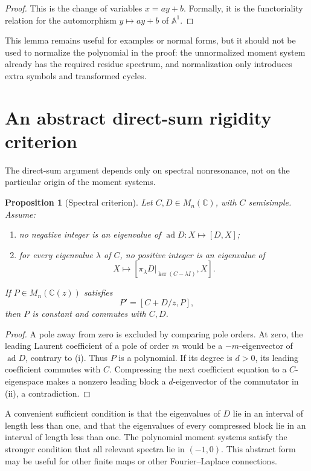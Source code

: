 \documentclass[11pt]{article}
\newtheorem{proposition}{Proposition}[section]
\theoremstyle{definition}
\newcommand{\C}{\mathbb C}
\newcommand{\Aone}{\mathbb A^1}
\begin{document}
\begin{proof}
This is the change of variables $x=ay+b$.  Formally, it is the
functoriality relation for the automorphism $y\mapsto ay+b$ of $\Aone$.
\end{proof}

This lemma remains useful for examples or normal forms, but it should not be
used to normalize the polynomial in the proof: the unnormalized moment
system already has the required residue spectrum, and normalization only
introduces extra symbols and transformed cycles.

\section{An abstract direct-sum rigidity criterion}

The direct-sum argument depends only on spectral nonresonance, not on the
particular origin of the moment systems.

\begin{proposition}[Spectral criterion]
Let $C,D\in M_n(\C)$, with $C$ semisimple.  Assume:
\begin{enumerate}[label=\textup{(\roman*)},leftmargin=2.4em]
\item no negative integer is an eigenvalue of
$\operatorname{ad}D:X\mapsto[D,X]$;
\item for every eigenvalue $\lambda$ of $C$, no positive integer is an
eigenvalue of
\[
  X\longmapsto
  [\pi_\lambda D|_{\ker(C-\lambda I)},X].
\]
\end{enumerate}
If $P\in M_n(\C(z))$ satisfies
\[
  P'=[C+D/z,P],
\]
then $P$ is constant and commutes with $C,D$.
\end{proposition}

\begin{proof}
A pole away from zero is excluded by comparing pole orders.  At zero, the
leading Laurent coefficient of a pole of order $m$ would be a
$-m$-eigenvector of $\operatorname{ad}D$, contrary to (i).  Thus $P$ is a
polynomial.  If its degree is $d>0$, its leading coefficient commutes with
$C$.  Compressing the next coefficient equation to a $C$-eigenspace makes a
nonzero leading block a $d$-eigenvector of the commutator in (ii), a
contradiction.
\end{proof}

A convenient sufficient condition is that the eigenvalues of $D$ lie in an
interval of length less than one, and that the eigenvalues of every
compressed block lie in an interval of length less than one.  The polynomial
moment systems satisfy the stronger condition that all relevant spectra lie
in $(-1,0)$.  This abstract form may be useful for other finite maps or
other Fourier--Laplace connections.
\end{document}
